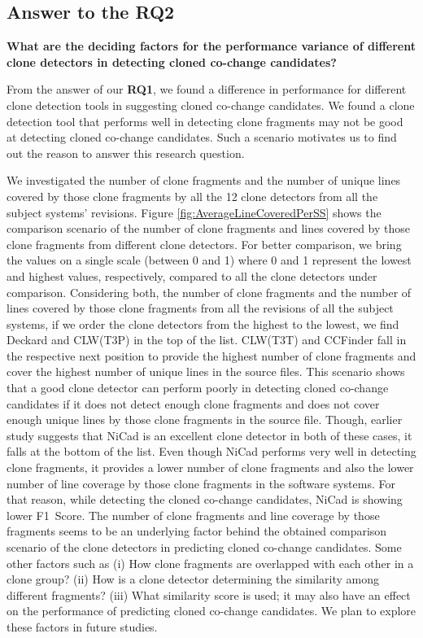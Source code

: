 \documentclass[review]{elsarticle}
\begin{document}
\subsection{Answer to the \textbf{RQ2}}
\textbf{What are the deciding factors for the performance variance of different clone detectors in detecting cloned co-change candidates?} 

From the answer of our \textbf{RQ1}, we found a difference in performance for different clone detection tools in suggesting cloned co-change candidates. We found a clone detection tool that performs well in detecting clone fragments may not be good at detecting cloned co-change candidates.  Such a scenario motivates us to find out the reason to answer this research question. 

We investigated the number of clone fragments and the number of unique lines covered by those clone fragments by all the 12 clone detectors from all the subject systems' revisions. Figure \ref{fig:AverageLineCoveredPerSS}  shows the comparison scenario of the number of clone fragments and lines covered by those clone fragments from different clone detectors. For better comparison, we bring the values on a single scale (between 0 and 1) where 0 and 1 represent the lowest and highest values, respectively, compared to all the clone detectors under comparison. Considering both, the number of clone fragments and the number of lines covered by those clone fragments from all the revisions of all the subject systems, if we order the clone detectors from the highest to the lowest, we find Deckard and CLW(T3P) in the top of the list. CLW(T3T) and CCFinder fall in the respective next position to provide the highest number of clone fragments and cover the highest number of unique lines in the source files. This scenario shows that a good clone detector can perform poorly in detecting cloned co-change candidates if it does not detect enough clone fragments and does not cover enough unique lines by those clone fragments in the source file. Though, earlier study \cite{Mondal-2014-PRC-2597073-2597104rankingCoChange} suggests that NiCad is an excellent clone detector in both of these cases, it falls at the bottom of the list. Even though NiCad performs very well in detecting clone fragments, it provides a lower number of clone fragments and also the lower number of line coverage by those clone fragments in the software systems. For that reason, while detecting the cloned co-change candidates, NiCad is showing lower F1~Score. The number of clone fragments and line coverage by those fragments seems to be an underlying factor behind the obtained comparison scenario of the clone detectors in predicting cloned co-change candidates. Some other factors such as (i) How clone fragments are overlapped with each other in a clone group? (ii) How is a clone detector determining the similarity among different fragments? (iii) What similarity score is used; it may also have an effect on the performance of predicting cloned co-change candidates. We plan to explore these factors in future studies.
\end{document}
